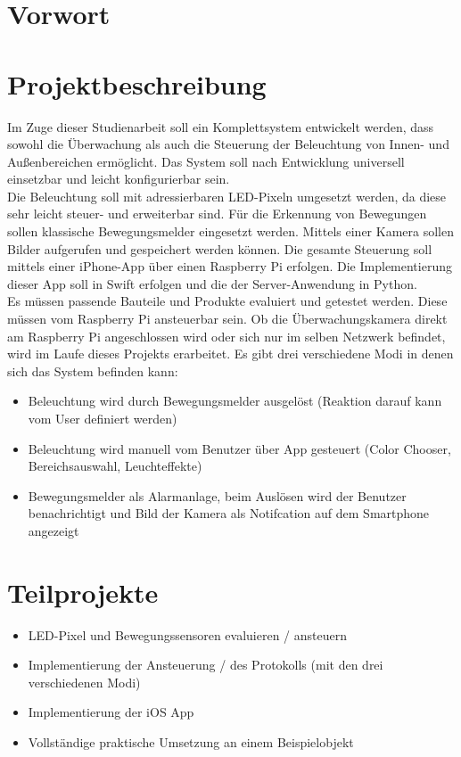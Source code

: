 \section{Vorwort}
\section{Projektbeschreibung}
Im Zuge dieser Studienarbeit soll ein Komplettsystem entwickelt werden, dass sowohl die Überwachung als auch die Steuerung der Beleuchtung von Innen- und Außenbereichen ermöglicht. Das System soll nach Entwicklung universell einsetzbar und leicht konfigurierbar sein.\\
Die Beleuchtung soll mit adressierbaren LED-Pixeln umgesetzt werden, da diese sehr leicht steuer- und erweiterbar sind. Für die Erkennung von Bewegungen sollen klassische Bewegungsmelder eingesetzt werden. Mittels einer Kamera sollen Bilder aufgerufen und gespeichert werden können. Die gesamte Steuerung soll mittels einer iPhone-App über einen Raspberry Pi erfolgen. Die Implementierung dieser App soll in Swift erfolgen und die der Server-Anwendung in Python.  \\
Es müssen passende Bauteile und Produkte evaluiert und getestet werden. Diese müssen vom Raspberry Pi ansteuerbar sein. Ob die Überwachungskamera direkt am Raspberry Pi angeschlossen wird oder sich nur im selben Netzwerk befindet, wird im Laufe dieses Projekts erarbeitet. 
Es gibt drei verschiedene Modi in denen sich das System befinden kann:
\begin{itemize}
\item Beleuchtung wird durch Bewegungsmelder ausgelöst (Reaktion darauf kann vom User definiert werden)
\item Beleuchtung wird manuell vom Benutzer über App gesteuert (Color Chooser, Bereichsauswahl, Leuchteffekte)
\item Bewegungsmelder als Alarmanlage, beim Auslösen wird der Benutzer benachrichtigt und Bild der Kamera als Notifcation auf dem Smartphone angezeigt
\end{itemize}

\section{Teilprojekte}
\begin{itemize}
\item LED-Pixel und Bewegungssensoren evaluieren / ansteuern
\item Implementierung der Ansteuerung / des Protokolls (mit den drei verschiedenen Modi)
\item Implementierung der iOS App
\item Vollständige praktische Umsetzung an einem Beispielobjekt
\end{itemize}

